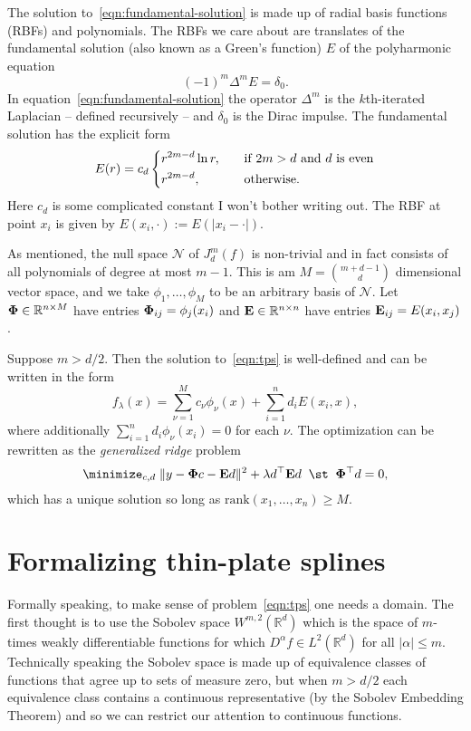 \documentclass{article}
\newcommand{\mc}[1]{\mathcal{#1}}
\newcommand{\Reals}{\mathbb{R}} %
\newcommand{\Rd}{\Reals^d}
\newcommand{\1}{\mathbf{1}}
\begin{document}
The solution to~\eqref{eqn:fundamental-solution} is made up of radial basis functions (RBFs) and polynomials. The RBFs we care about are translates of the fundamental solution (also known as a Green's function) $E$ of the polyharmonic equation
\begin{equation}
\label{eqn:fundamental-solution}
(-1)^m\Delta^{m} E = \delta_0.
\end{equation}
In equation~\eqref{eqn:fundamental-solution} the operator $\Delta^{m}$ is the $k$th-iterated Laplacian -- defined recursively -- and $\delta_0$ is the Dirac impulse. The fundamental solution has the explicit form
\begin{equation*}
E(r) =  c_d 
\begin{dcases}
r^{2m - d} \ln r, \quad & \textrm{if $2m > d$ and $d$ is even} \\
r^{2m - d}, \quad & \textrm{otherwise.}
\end{dcases}
\end{equation*}
Here $c_d$ is some complicated constant I won't bother writing out. The RBF at point $x_i$ is given by $E(x_i,\cdot) := E(|x_i - \cdot|)$. 

As mentioned, the null space $\mc{N}$ of $J_d^m(f)$ is non-trivial and in fact consists of all polynomials of degree at most $m - 1$. This is am $M = {m + d - 1\choose d}$ dimensional vector space, and we take $\phi_{1},\ldots,\phi_M$ to be an arbitrary basis of $\mc{N}$. Let ${\bf \Phi} \in \Reals^{n \times M}$ have entries ${\bf \Phi}_{ij} = \phi_j(x_i)$ and ${\bf E} \in \Reals^{n \times n}$ have entries ${\bf E}_{ij} = E(x_i,x_j)$. 
\begin{theorem}
	\label{thm:tps-representer}
	Suppose $m > d/2$. Then the solution to~\eqref{eqn:tps} is well-defined and can be written in the form 
	$$f_{\lambda}(x) = \sum_{\nu = 1}^{M} c_{\nu} \phi_{\nu}(x) + \sum_{i = 1}^{n} d_i E(x_i,x),$$ 
	where additionally $\sum_{i = 1}^{n} d_i \phi_{\nu}(x_i) = 0$ for each $\nu$. The optimization can be rewritten as the \emph{generalized ridge} problem
	\begin{equation}
	\label{eqn:tps-ridge}
	\minimize_{c,d} \; \|y - {\bf \Phi} c - {\bf E} d\|^2 + \lambda d^{\top} {\bf E} d \;\; \st \;\; {\bf \Phi}^{\top}d = 0,
	\end{equation}
	which has a unique solution so long as $\mathrm{rank}(x_1,\ldots,x_n) \geq M$.
\end{theorem}

\section{Formalizing thin-plate splines}
Formally speaking, to make sense of problem~\eqref{eqn:tps} one needs a domain. The first thought is to use the Sobolev space $W^{m,2}(\Rd)$ which is the space of $m$-times weakly differentiable functions for which $D^{\alpha}f \in L^2(\Rd)$ for all $|\alpha| \leq m$. Technically speaking the Sobolev space is made up of equivalence classes of functions that agree up to sets of measure zero, but when $m > d/2$ each equivalence class contains a continuous representative (by the Sobolev Embedding Theorem) and so we can restrict our attention to continuous functions.  
\end{document}

